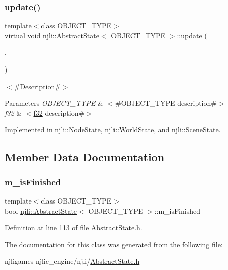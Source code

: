 \subsubsection{\texorpdfstring{update()}{update()}}
{\footnotesize\ttfamily template$<$class O\+B\+J\+E\+C\+T\+\_\+\+T\+Y\+PE$>$ \\
virtual \mbox{\hyperlink{_thread_8h_af1e856da2e658414cb2456cb6f7ebc66}{void}} \mbox{\hyperlink{classnjli_1_1_abstract_state}{njli\+::\+Abstract\+State}}$<$ O\+B\+J\+E\+C\+T\+\_\+\+T\+Y\+PE $>$\+::update (\begin{DoxyParamCaption}\item[{O\+B\+J\+E\+C\+T\+\_\+\+T\+Y\+PE $\ast$}]{,  }\item[{\mbox{\hyperlink{_util_8h_a5f6906312a689f27d70e9d086649d3fd}{f32}}}]{ }\end{DoxyParamCaption})\hspace{0.3cm}{\ttfamily [pure virtual]}}

$<$\#\+Description\#$>$


\begin{DoxyParams}{Parameters}
{\em O\+B\+J\+E\+C\+T\+\_\+\+T\+Y\+PE} & $<$\#\+O\+B\+J\+E\+C\+T\+\_\+\+T\+Y\+PE description\#$>$ \\
\hline
{\em f32} & $<$\mbox{\hyperlink{_util_8h_a5f6906312a689f27d70e9d086649d3fd}{f32}} description\#$>$ \\
\hline
\end{DoxyParams}


Implemented in \mbox{\hyperlink{classnjli_1_1_node_state_a627419875be255906b52e08d63fe61a3}{njli\+::\+Node\+State}}, \mbox{\hyperlink{classnjli_1_1_world_state_a7390c8af937d9be5f95e33e300321171}{njli\+::\+World\+State}}, and \mbox{\hyperlink{classnjli_1_1_scene_state_afa0b086c1bf0a41bf9caf7408ce2d324}{njli\+::\+Scene\+State}}.



\subsection{Member Data Documentation}
\mbox{\label{classnjli_1_1_abstract_state_a445a5d1ac7572b8b01b81937c89e960c}} 
\subsubsection{\texorpdfstring{m\+\_\+is\+Finished}{m\_isFinished}}
{\footnotesize\ttfamily template$<$class O\+B\+J\+E\+C\+T\+\_\+\+T\+Y\+PE$>$ \\
bool \mbox{\hyperlink{classnjli_1_1_abstract_state}{njli\+::\+Abstract\+State}}$<$ O\+B\+J\+E\+C\+T\+\_\+\+T\+Y\+PE $>$\+::m\+\_\+is\+Finished\hspace{0.3cm}{\ttfamily [private]}}



Definition at line 113 of file Abstract\+State.\+h.



The documentation for this class was generated from the following file\+:\begin{DoxyCompactItemize}
\item 
njligames-\/njlic\+\_\+engine/njli/\mbox{\hyperlink{_abstract_state_8h}{Abstract\+State.\+h}}\end{DoxyCompactItemize}
